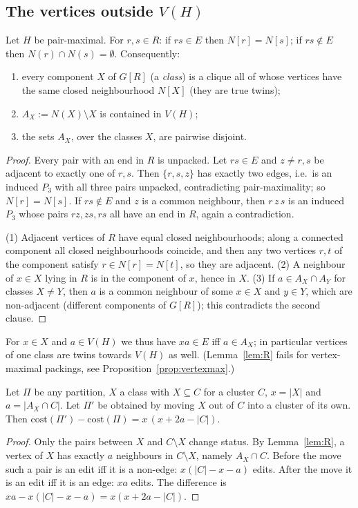 \subsection{The vertices outside \texorpdfstring{$V(H)$}{V(H)}}
\begin{lemma}[Structure of $R$]\label{lem:R}
Let $H$ be pair-maximal. For $r,s\in R$: if $rs\in E$ then $N[r]=N[s]$; if $rs\notin E$ then $N(r)\cap N(s)=\emptyset$. Consequently:
\begin{enumerate}
\item every component $X$ of $G[R]$ (a \emph{class}) is a clique all of whose vertices have the same closed neighbourhood $N[X]$ (they are true twins);
\item $A_X:=N(X)\setminus X$ is contained in $V(H)$;
\item the sets $A_X$, over the classes $X$, are pairwise disjoint.
\end{enumerate}
\end{lemma}
\begin{proof}
Every pair with an end in $R$ is unpacked. Let $rs\in E$ and $z\ne r,s$ be adjacent to exactly one of $r,s$. Then $\{r,s,z\}$ has exactly two edges, i.e.\ is an induced $P_3$ with all three pairs unpacked, contradicting pair-maximality; so $N[r]=N[s]$. If $rs\notin E$ and $z$ is a common neighbour, then $r\,z\,s$ is an induced $P_3$ whose pairs $rz,zs,rs$ all have an end in $R$, again a contradiction.

(1) Adjacent vertices of $R$ have equal closed neighbourhoods; along a connected component all closed neighbourhoods coincide, and then any two vertices $r,t$ of the component satisfy $r\in N[r]=N[t]$, so they are adjacent. (2) A neighbour of $x\in X$ lying in $R$ is in the component of $x$, hence in $X$. (3) If $a\in A_X\cap A_Y$ for classes $X\ne Y$, then $a$ is a common neighbour of some $x\in X$ and $y\in Y$, which are non-adjacent (different components of $G[R]$); this contradicts the second clause.
\end{proof}
For $x\in X$ and $a\in V(H)$ we thus have $xa\in E$ iff $a\in A_X$; in particular vertices of one class are twins towards $V(H)$ as well. (Lemma~\ref{lem:R} fails for vertex-maximal packings, see Proposition~\ref{prop:vertexmax}.)

\begin{lemma}\label{lem:exch}
Let $\Pi$ be any partition, $X$ a class with $X\subseteq C$ for a cluster $C$, $x=|X|$ and $a=|A_X\cap C|$. Let $\Pi'$ be obtained by moving $X$ out of $C$ into a cluster of its own. Then $\mathrm{cost}(\Pi')-\mathrm{cost}(\Pi)=x\,(x+2a-|C|)$.
\end{lemma}
\begin{proof}
Only the pairs between $X$ and $C\setminus X$ change status. By Lemma~\ref{lem:R}, a vertex of $X$ has exactly $a$ neighbours in $C\setminus X$, namely $A_X\cap C$. Before the move such a pair is an edit iff it is a non-edge: $x(|C|-x-a)$ edits. After the move it is an edit iff it is an edge: $xa$ edits. The difference is $xa-x(|C|-x-a)=x(x+2a-|C|)$.
\end{proof}

